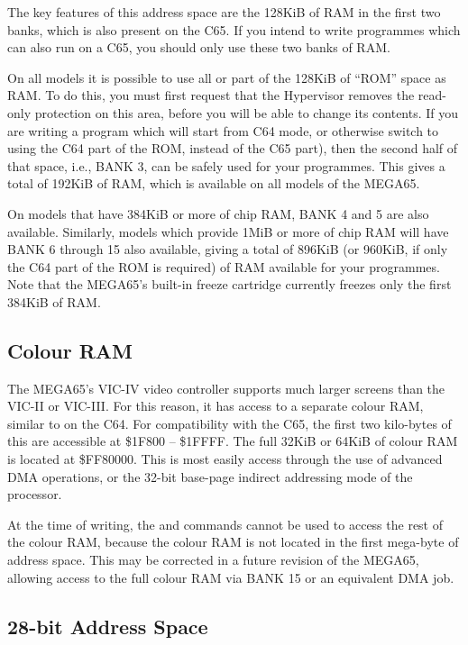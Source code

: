 The key features of this address space are the 128KiB of RAM in the first two banks, which is also present on
the C65. If you intend to write programmes which can also run on a C65, you should only use these two banks
of RAM.

On all models it is possible to use all or part of the 128KiB of ``ROM'' space as RAM. To do this, you must first
request that the Hypervisor removes the read-only protection on this area, before you will be able to change
its contents.  If you are writing a program which will start from C64 mode, or otherwise switch to using the C64
part of the ROM, instead of the C65 part), then the second half of that space, i.e., BANK 3, can be safely used
for your programmes. This gives a total of 192KiB of RAM, which is available on all models of the MEGA65.

On models that have 384KiB or more of chip RAM, BANK 4 and 5 are also available.  Similarly, models which provide
1MiB or more of chip RAM will have BANK 6 through 15 also available, giving a total of 896KiB (or 960KiB, if only
the C64 part of the ROM is required) of RAM available for your programmes.  Note that the MEGA65's built-in
freeze cartridge currently freezes only the first 384KiB of RAM.

\subsection{Colour RAM}

The MEGA65's VIC-IV video controller supports much larger screens than the VIC-II or VIC-III. For this reason, it
has access to a separate colour RAM, similar to on the C64.  For compatibility with the C65, the first two kilo-bytes
of this are accessible at \$1F800 -- \$1FFFF.  The full 32KiB or 64KiB of colour RAM is located at \$FF80000.
This is most easily access through the use of advanced DMA operations, or the 32-bit base-page indirect addressing
mode of the processor.

At the time of writing, the  and  commands cannot be used to access the rest of the colour RAM, because the
colour RAM is not located in the first mega-byte of address space.  This may be corrected in a future revision of
the MEGA65, allowing access to the full colour RAM via BANK 15 or an equivalent DMA job.

\subsection{28-bit Address Space}

